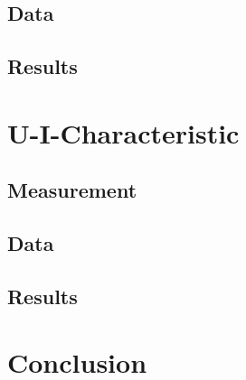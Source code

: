 \documentclass[12pt,a4paper]{article}
\begin{document}
\subsection{Data}

\subsection{Results}


\section{U-I-Characteristic}
\subsection{Measurement}

\subsection{Data}

\subsection{Results}


\section{Conclusion}






\end{document}
